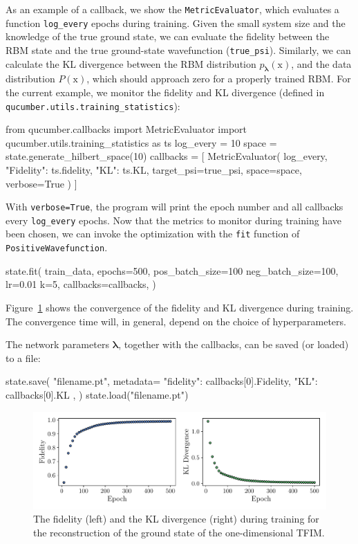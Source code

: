 \documentclass[submission, Phys, hidelnks]{SciPost}
\newcommand{\x}{\bm{\mathrm{x}}}
\begin{document}
As an example of a callback, we show the \verb|MetricEvaluator|, which
evaluates a function \verb|log_every| epochs during training.
Given the small system size and the knowledge of the true ground state, we can
evaluate the fidelity between the RBM state and the true ground-state
wavefunction (\verb|true_psi|).
Similarly, we can calculate the KL divergence between the RBM distribution
$p_{\bm{\lambda}}(\x)$, and the data distribution $P(\x)$, which should
approach zero for a properly trained RBM.\@
For the current example, we monitor the fidelity and KL divergence (defined in
\verb|qucumber.utils.training_statistics|):
\begin{python}
from qucumber.callbacks import MetricEvaluator
import qucumber.utils.training_statistics as ts
log_every = 10
space = state.generate_hilbert_space(10)
callbacks = [
    MetricEvaluator(
        log_every,
        {"Fidelity": ts.fidelity, "KL": ts.KL},
        target_psi=true_psi,
        space=space,
        verbose=True
    )
]
\end{python}
With \verb|verbose=True|, the program will print the epoch number and all
callbacks every \verb|log_every| epochs. Now that the metrics to monitor during
training have been chosen, we can invoke the optimization with the \verb|fit|
function of \verb|PositiveWavefunction|.
\begin{python}
state.fit(
    train_data,
    epochs=500,
    pos_batch_size=100
    neg_batch_size=100,
    lr=0.01
    k=5,
    callbacks=callbacks,
)
\end{python}

Figure~\ref{fig:KL} shows the convergence of the fidelity and KL divergence
during training. The convergence time will, in general, depend on the choice
of hyperparameters.

The network parameters $\bm{\lambda}$, together with the callbacks, can be
saved (or loaded) to a file:
\begin{python}
state.save(
    "filename.pt",
    metadata={
        "fidelity": callbacks[0].Fidelity,
        "KL": callbacks[0].KL
    },
)
state.load("filename.pt")
\end{python}

\begin{figure}[hbt]
    \centering{}
    \includegraphics[width=\columnwidth, trim={0 15 0 0}, clip]{fid_KL.pdf}
    \caption{
        The fidelity (left) and the KL divergence (right) during training for
        the reconstruction of the ground state of the one-dimensional TFIM.\@
    }\label{fig:KL}
\end{figure}
\end{document}
